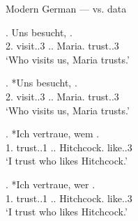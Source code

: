 \documentclass[xcolor=dvipsnames,10pt]{beamer}
\begin{document}
\begin{frame}{Modern German ---  vs.  data}

\exg. Uns besucht,   .\\
2. visit..3\scsub{[nom]} .. Maria. trust..3\scsub{[dat]}\\
`Who visits us, Maria trusts.' \label{ex:mg-nom-dat}

\pause

\exg. *Uns besucht,   .\\
2. visit..3\scsub{[nom]} .. Maria. trust..3\scsub{[dat]}\\
`Who visits us, Maria trusts.' \label{ex:mg-nom-dat-u}

\pause

\exg. *Ich vertraue, wem  .\\
1. trust..1\scsub{[dat]} .. Hitchcock. like..3\scsub{[nom]}\\
`I trust who likes Hitchcock.' \label{ex:mg-dat-nom}

\pause

\exg. *Ich vertraue, wer  .\\
1. trust..1\scsub{[dat]} .. Hitchcock. like..3\scsub{[nom]}\\
`I trust who likes Hitchcock.' \label{ex:mg-dat-nom-u}

\end{frame}
\end{document}
